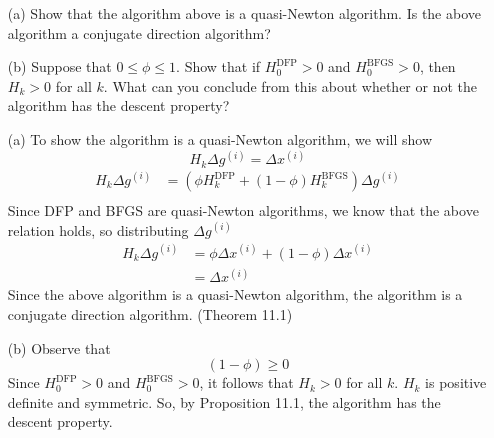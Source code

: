 \documentclass{article}
\begin{document}
\begin{enumerate}
\begin{bb}
\begin{enumerate}
    \item[(a)] Show that the algorithm above is a quasi-Newton algorithm. Is the above algorithm a conjugate direction algorithm?
    \item[(b)] Suppose that $0 \leq \phi \leq 1$. Show that if $H_0^{\text{DFP}} > 0$ and $H_0^{\text{BFGS}} > 0$, then $H_k > 0$ for all $k$. What can you conclude from this about whether or not the algorithm has the descent property?
\end{enumerate}
\end{bb}
\begin{enumerate}
  \item[(a)] 
  To show the algorithm is a quasi-Newton algorithm, we will show
  \[
  H_{k}\Delta g^{(i)} = \Delta x^{(i)}  
  \]
  \begin{align*}
    H_k\Delta g^{(i)} &= (\phi H_k^{\text{DFP}} + (1 - \phi) H_k^{\text{BFGS}}) \Delta g^{(i)}\\
  \end{align*}
  Since DFP and BFGS are quasi-Newton algorithms, we know that the above relation holds, so distributing $\Delta g^{(i)}$
  \begin{align*}
    H_{k}\Delta g^{(i)} &= \phi \Delta x^{(i)} + (1 - \phi) \Delta x^{(i)}\\
    &= \Delta x^{(i)}
  \end{align*}
  Since the above algorithm is a quasi-Newton algorithm, the algorithm is a conjugate direction algorithm. (Theorem 11.1)

  \item[(b)]
  Observe that
  \[(1-\phi) \geq 0 \]
  Since $H_0^{\text{DFP}} > 0$ and $H_0^{\text{BFGS}} > 0$, it follows that $H_k > 0$ for all $k$.
  $H_k$ is positive definite and symmetric. So, by Proposition 11.1, the algorithm has the descent property.
\end{enumerate}

\end{enumerate}
\end{document}
